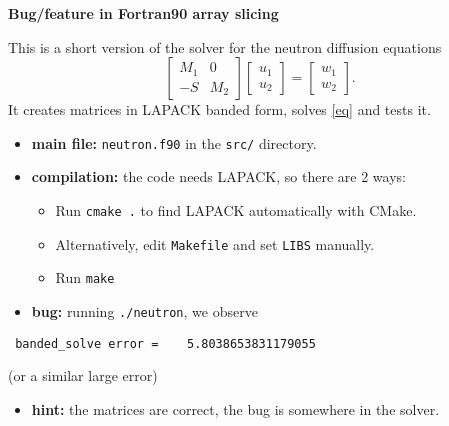 \documentclass{slides}
\begin{document}
\begin{center}
{\large\bf Bug/feature in Fortran90 array slicing}
\end{center}


This is a short version of the solver for the neutron diffusion equations
\begin{equation}
\begin{bmatrix}
 M_1 & 0 \\
 -S  & M_2
\end{bmatrix}
\begin{bmatrix}
 u_1 \\
 u_2
\end{bmatrix} =
\begin{bmatrix}
 w_1 \\
 w_2
\end{bmatrix}.
\label{eq}
\end{equation}
It creates matrices in LAPACK banded form, solves \eqref{eq} and tests it.


\begin{itemize}
 \item \textbf{main file:} \verb+neutron.f90+ in the \verb+src/+ directory.
 \vspace*{-3ex}
 \item \textbf{compilation:} the code needs LAPACK, so there are 2 ways:
 \begin{itemize}
 \vspace*{-2ex}
  \item Run \verb*+cmake .+ to find LAPACK automatically with CMake.
 \vspace*{-2ex}
  \item Alternatively, edit \verb+Makefile+ and set \verb+LIBS+ manually.
 \vspace*{-2ex}
  \item Run \verb+make+
 \end{itemize}
 \vspace*{-3ex}
 \item \textbf{bug:} running \verb+./neutron+, we observe
\end{itemize}
\vspace*{-3ex}
\begin{verbatim}
 banded_solve error =    5.8038653831179055
\end{verbatim}
\vspace*{-2ex}
(or a similar large error)

\vspace*{-2ex}
\begin{itemize}
 \item \textbf{hint:} the matrices are correct, the bug is somewhere in the solver.
\end{itemize}
\end{document}
